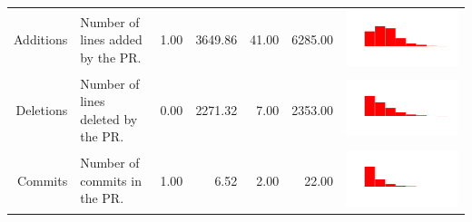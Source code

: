 \begin{table}[ht]
\begin{tabular}{rp{20em}rrrrc}
    Additions & Number of lines added by the PR. & 1.00 & 3649.86 & 41.00 & 6285.00 & \includegraphics[scale = 0.1, clip = true, trim= 50px 60px 50px 60px]{../figs/hist-features/hist-additions.pdf} \\
    Deletions & Number of lines deleted by the PR. & 0.00 & 2271.32 & 7.00 & 2353.00 & \includegraphics[scale = 0.1, clip = true, trim= 50px 60px 50px 60px]{../figs/hist-features/hist-deletions.pdf} \\
    Commits & Number of commits in the PR. & 1.00 & 6.52 & 2.00 & 22.00 & \includegraphics[scale = 0.1, clip = true, trim= 50px 60px 50px 60px]{../figs/hist-features/hist-commits.pdf} \\

\end{tabular}
\end{table}
